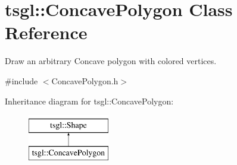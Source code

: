 \hypertarget{classtsgl_1_1_concave_polygon}{\section{tsgl\-:\-:Concave\-Polygon Class Reference}
\label{classtsgl_1_1_concave_polygon}
}


Draw an arbitrary Concave polygon with colored vertices.  




{\ttfamily \#include $<$Concave\-Polygon.\-h$>$}

Inheritance diagram for tsgl\-:\-:Concave\-Polygon\-:\begin{figure}[H]
\begin{center}
\leavevmode
\includegraphics[height=2.000000cm]{classtsgl_1_1_concave_polygon}
\end{center}
\end{figure}
